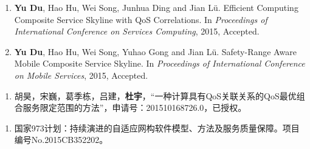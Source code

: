 \documentclass[twoside, master]{NJUthesis}
\theoremstyle{plain}
\begin{document}


\begin{enumerate}[label=\arabic*., labelindent=0em, leftmargin=*]
	\item \textbf{Yu Du}, Hao Hu, Wei Song, Junhua Ding and Jian L\"{u}. Efficient Computing Composite Service Skyline with QoS Correlations. In \emph{Proceedings of International Conference on Services Computing}, 2015, Accepted.
    \item \textbf{Yu Du}, Hao Hu, Wei Song, Yuhao Gong and Jian L\"{u}. Safety-Range Aware Mobile Composite Service Skyline. In \emph{Proceedings of International Conference on Mobile Services}, 2015, Accepted.
\end{enumerate}


\begin{enumerate}[label=\arabic*., labelindent=0em, leftmargin=*]
	\item 胡昊，宋巍，葛季栋，吕建，\textbf{杜宇}，``一种计算具有QoS关联关系的QoS最优组合服务限定范围的方法''，申请号：201510168726.0，已授权。
\end{enumerate}

\vspace{4ex}

\begin{enumerate}[label=\arabic*., labelindent=0em, leftmargin=*]
	\item 国家973计划：持续演进的自适应网构软件模型、方法及服务质量保障。项目编号No.2015CB352202。
\end{enumerate}

\end{document}
